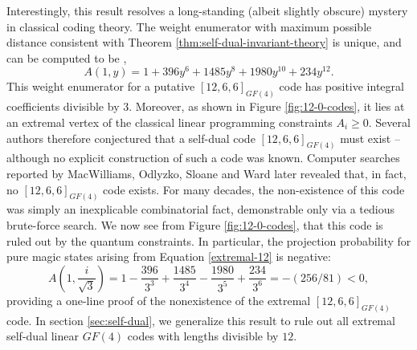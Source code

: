 \documentclass[11pt]{article}
\begin{document}
Interestingly, this result resolves a long-standing (albeit slightly obscure) mystery in classical coding theory.  The weight enumerator with maximum possible distance consistent with Theorem \ref{thm:self-dual-invariant-theory} is unique, and can be computed to be \cite{macwilliams1978self},
\begin{equation}
   A(1,y) = 1+396 y^6+1485 y^8+1980 y^{10}+234 y^{12}. \label{extremal-12}
\end{equation}
This weight enumerator for a putative $[12,6,6]_{GF(4)}$ code has positive integral coefficients divisible by 3. Moreover, as shown in Figure \ref{fig:12-0-codes}, it lies at an extremal vertex of the classical linear programming constraints $A_i\geq 0$. Several authors therefore conjectured that a self-dual code $[12,6,6]_{GF(4)}$ must exist \cite{semakov1971uniformly,paper2} -- although no explicit construction of such a code was known. Computer searches reported by MacWilliams, Odlyzko, Sloane and Ward \cite{macwilliams1978self} later revealed that, in fact, no $[12,6,6]_{GF(4)}$ code exists. For many decades, the non-existence of this code was simply an inexplicable combinatorial fact, demonstrable only via a tedious brute-force search. We now see from Figure \ref{fig:12-0-codes}, that this code is ruled out by the quantum constraints. In particular, the projection probability for pure magic states arising from Equation \eqref{extremal-12} is negative:
\begin{equation}
A(1, \frac{i}{\sqrt{3}}) = 1-\frac{396}{3^3}+\frac{1485}{3^4}-\frac{1980}{3^5}+\frac{234}{3^6} = -(256/81) <0,
\end{equation}
providing a one-line proof of the nonexistence of the extremal $[12,6,6]_{GF(4)}$ code. In section \ref{sec:self-dual}, we generalize this result to rule out all extremal self-dual linear $GF(4)$ codes with lengths divisible by $12$.
\end{document}
